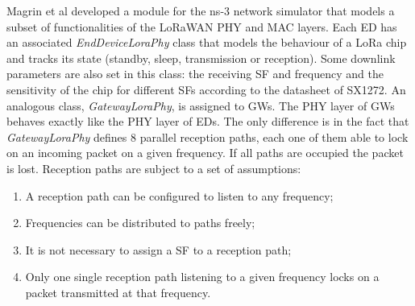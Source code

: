 Magrin et al \cite{ref:soa-lora-scal5} developed a module for the ns-3 network simulator that models a subset of functionalities of the LoRaWAN PHY and MAC layers. Each \gls{ED} has an associated \textit{EndDeviceLoraPhy} class that models the behaviour of a LoRa chip and tracks its state (standby, sleep, transmission or reception). Some downlink parameters are also set in this class: the receiving \gls{SF} and frequency and the sensitivity of the chip for different \glspl{SF} according to the datasheet of SX1272. An analogous class, \textit{GatewayLoraPhy}, is assigned to \glspl{GW}. The PHY layer of \glspl{GW} behaves exactly like the PHY layer of \glspl{ED}. The only difference is in the fact that \textit{GatewayLoraPhy} defines 8 parallel reception paths, each one of them able to lock on an incoming packet on a given frequency. If all paths are occupied the packet is lost. Reception paths are subject to a set of assumptions:

\begin{enumerate}
	\item A reception path can be configured to listen to any frequency;
	\item Frequencies can be distributed to paths freely;
	\item It is not necessary to assign a \gls{SF} to a reception path;
	\item Only one single reception path listening to a given frequency locks on a packet transmitted at that frequency.
\end{enumerate}

